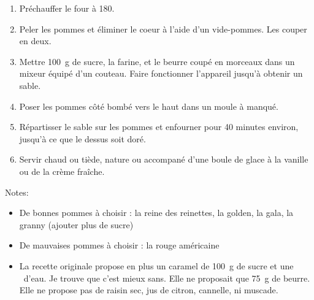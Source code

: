
\begin{ingredients}
\end{ingredients}


\begin{recipe}
  \begin{enumerate}

  \item Préchauffer le four à 180\degreeC.

  \item Peler les pommes et éliminer le coeur à l'aide d'un
    vide-pommes.  Les couper en deux.

  \item Mettre 100~g de sucre, la farine, et le beurre coupé en
    morceaux dans un mixeur équipé d'un couteau.  Faire
    fonctionner l'appareil jusqu'à obtenir un sable.

  \item Poser les pommes côté bombé vers le haut dans un moule à manqué.

  \item Répartisser le sable sur les pommes et enfourner pour 40
    minutes environ, jusqu'à ce que le dessus soit doré.

  \item Servir chaud ou tiède, nature ou accompané d'une boule de
    glace à la vanille ou de la crème fraîche.

  \end{enumerate}
\end{recipe}

Notes:
\begin{itemize}
\item De bonnes pommes à choisir : la reine des reinettes, la
  golden, la gala, la granny (ajouter plus de sucre)
\item De mauvaises pommes à choisir : la rouge américaine
\item La recette originale propose en plus un caramel de 100~g de
  sucre et une \ccf\ d'eau.  Je trouve que c'est mieux sans.  Elle ne
  proposait que 75~g de beurre.  Elle ne propose pas de raisin sec,
  jus de citron, cannelle, ni muscade.
\end{itemize}
